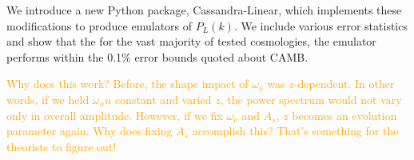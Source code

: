 We introduce a new Python package, Cassandra-Linear, which implements these
modifications to produce emulators of $P_L(k)$. We include various error 
statistics and show that the for the vast majority of tested cosmologies, the 
emulator performs within the 0.1\%  error bounds quoted about 
CAMB.

\textcolor{orange}{Why does this work? Before, the shape impact of
$\omega_\nu$ 
was $z$-dependent. In other words, if we held $\omega_nu$ constant and varied
$z$, the power spectrum would not vary only in overall amplitude. However, if
we fix $\omega_\nu$ and $A_s$, $z$ becomes an evolution parameter again. Why
does fixing $A_s$ accomplish this? That's something for the theorists to 
figure out!}

